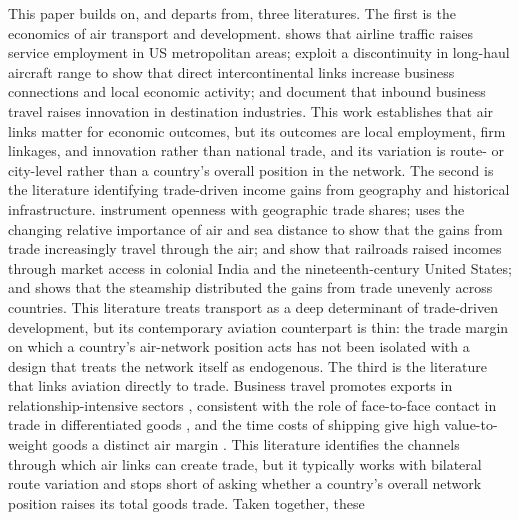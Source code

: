 This paper builds on, and departs from, three literatures. The first is the economics of air transport and development. \citet{Brueckner_2003} shows that airline traffic raises service employment in US metropolitan areas; \citet{Campante_2017} exploit a discontinuity in long-haul aircraft range to show that direct intercontinental links increase business connections and local economic activity; and \citet{Hovhannisyan_2015} document that inbound business travel raises innovation in destination industries. This work establishes that air links matter for economic outcomes, but its outcomes are local employment, firm linkages, and innovation rather than national trade, and its variation is route- or city-level rather than a country's overall position in the network. The second is the literature identifying trade-driven income gains from geography and historical
infrastructure. \citet{Frankel_1999} instrument openness with geographic trade shares; \citet{Feyrer_2019} uses the changing relative importance of air and sea distance to show that the gains from trade increasingly travel
through the air; \citet{Donaldson_2018} and \citet{Donaldson_2016} show that railroads raised incomes through market access in colonial India and the nineteenth-century United States; and \citet{Pascali_2017} shows that
the steamship distributed the gains from trade unevenly across countries. This literature treats transport as a deep determinant of trade-driven development, but its contemporary aviation counterpart is thin: the trade
margin on which a country's air-network position acts has not been isolated with a design that treats the network itself as endogenous. The third is the literature that links aviation directly to trade. Business travel
promotes exports in relationship-intensive sectors \citep{Cristea_2011,Startz_2016,Soderlund_2023}, consistent with the role of face-to-face contact in trade in differentiated goods \citep{Rauch_1999}, and the time costs of shipping give high value-to-weight goods a distinct air margin \citep{Hummels_2013}. This literature identifies the channels through which air links can create trade, but it typically works with bilateral route variation and stops short of asking whether a country's overall network position raises its total goods trade. Taken together, these
